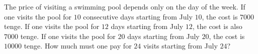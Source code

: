 The price of visiting a swimming pool depends only on the day of the week. If one visits the pool for $10$ consecutive days starting from July $10$, the cost is $7000$ tenge. If one visits the pool for $12$ days starting from July $12$, the cost is also $7000$ tenge. If one visits the pool for $20$ days starting from July $20$, the cost is $10000$ tenge. How much must one pay for $24$ visits starting from July $24$?
